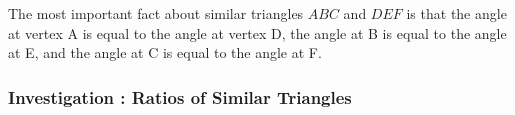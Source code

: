       
      \label{m39405*id78401}The most important fact about similar triangles \begin{math}ABC\end{math} and \begin{math}DEF\end{math} is that the angle at vertex A is equal to the angle at vertex D, the angle at B is equal to the angle at E, and the angle at C is equal to the angle at F.\par 
      \label{m39405*id78434}\nopagebreak\noindent{}
    
      
\label{m39405*secfhsst!!!underscore!!!id319}
            \subsubsection{  Investigation : Ratios of Similar Triangles }
            \nopagebreak
            

